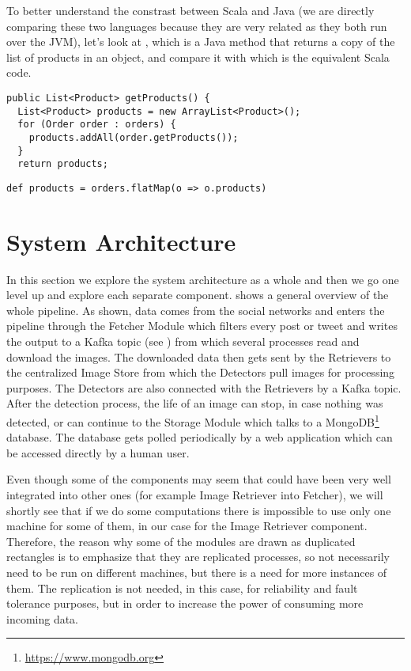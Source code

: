 To better understand the constrast between Scala and Java (we are directly
comparing these two languages because they are very related as they both run
over the JVM), let's look at , which is a
Java method that returns a copy of the list of products in an object, and
compare it with  which is the
equivalent Scala code.

\lstset{language=Java,caption=Code written in Java,label=lst:prod-java}
\begin{lstlisting}
public List<Product> getProducts() {
  List<Product> products = new ArrayList<Product>();
  for (Order order : orders) {
    products.addAll(order.getProducts());
  }
  return products;
\end{lstlisting}

\lstset{language=Scala,caption=Code written in Scala,label=lst:prod-scala}
\begin{lstlisting}
def products = orders.flatMap(o => o.products)
\end{lstlisting}

\section{System Architecture}
\label{sec:sys-arch}

In this section we explore the system architecture as a whole and then we go
one level up and explore each separate component.
 shows a general overview of the whole
pipeline. As shown, data comes from the social networks and enters the
pipeline through the Fetcher Module which filters every post or tweet and
writes the output to a Kafka topic (see
) from which several processes read and
download the images. The downloaded data then gets sent by the Retrievers to
the centralized Image Store from which the Detectors pull images for
processing purposes. The Detectors are also connected with the Retrievers by a
Kafka topic. After the detection process, the life of an image can stop, in
case nothing was detected, or can continue to the Storage Module which talks
to a MongoDB\footnote{\url{https://www.mongodb.org}} database. The database
gets polled periodically by a web application which can be accessed directly by a human
user.


Even though some of the components may seem that could have been very well
integrated into other ones (for example Image Retriever into Fetcher), we will
shortly see that if we do some computations there is impossible to use only
one machine for some of them, in our case for the Image Retriever component.
Therefore, the reason why some of the modules are drawn as duplicated
rectangles is to emphasize that they are replicated processes, so not
necessarily need to be run on different machines, but there is a need for more
instances of them. The replication is not needed, in this case, for
reliability and fault tolerance purposes, but in order to increase the power
of consuming more incoming data.

